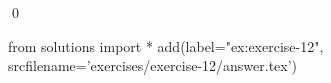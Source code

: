 
\begin{ex} 
  \label{ex:exercise-12}
  
  \qed
\end{ex} 
\begin{python0}
from solutions import *
add(label="ex:exercise-12",
    srcfilename='exercises/exercise-12/answer.tex') 
\end{python0}
